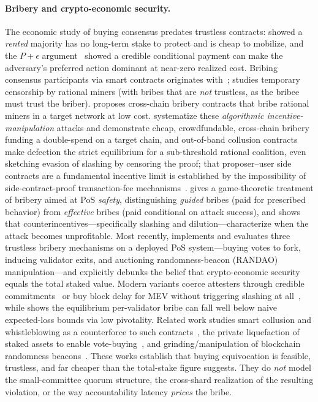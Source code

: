 \paragraph{Bribery and crypto-economic security.}
The economic study of buying consensus predates trustless contracts: \cite{bonneau2016rent} showed a
\emph{rented} majority has no long-term stake to protect and is cheap to mobilize, and the
$P{+}\epsilon$ argument~\cite{buterin2015pepsilon} showed a credible conditional payment can make the
adversary's preferred action dominant at near-zero realized cost. Bribing consensus participants via
smart contracts originates with~\cite{mccorry2018smart};
\cite{winzer2019temporary} studies temporary censorship by rational miners (with bribes that are
\emph{not} trustless, as the bribee must trust the briber). \cite{tran2023crosschain} proposes
cross-chain bribery contracts that bribe rational miners in a target network at low cost.
\cite{judmayer2021sok,judmayer2021paytowin} systematize these \emph{algorithmic
incentive-manipulation} attacks and demonstrate cheap, crowdfundable, cross-chain bribery funding a
double-spend on a target chain, and out-of-band collusion contracts~\cite{zhang2023outofband} make
defection the strict equilibrium for a sub-threshold rational coalition, even sketching evasion of
slashing by censoring the proof; that proposer--user side contracts are a fundamental incentive limit
is established by the impossibility of side-contract-proof transaction-fee
mechanisms~\cite{roughgarden2021tfm,chung2023foundations}.
\cite{karakostas2024bribing} gives a game-theoretic treatment of bribery aimed at PoS \emph{safety},
distinguishing \emph{guided} bribes (paid for prescribed behavior) from \emph{effective} bribes
(paid conditional on attack success), and shows that counterincentives---specifically slashing and
dilution---characterize when the attack becomes unprofitable. Most recently,
\cite{sookitoth2025bribers} implements and evaluates three trustless bribery mechanisms on a deployed
PoS system---buying votes to fork, inducing validator exits, and auctioning randomness-beacon
(RANDAO) manipulation---and explicitly debunks the belief that crypto-economic security equals the
total staked value. Modern variants coerce attesters through credible
commitments~\cite{sarenche2024commitment} or buy block delay for MEV without triggering slashing at
all~\cite{yang2024bride}, while \cite{newman2023decentralization} shows the equilibrium per-validator
bribe can fall well below naive expected-loss bounds via low pivotality. Related work studies smart
collusion and whistleblowing as a counterforce to
such contracts~\cite{kelkar2025omerta}, the private liquefaction of staked assets to enable
vote-buying~\cite{austgen2025liquefaction}, and grinding/manipulation of blockchain randomness
beacons~\cite{gazi2025grinding}. These works establish that buying equivocation is feasible,
trustless, and far cheaper than the total-stake figure suggests. They do \emph{not} model the
small-committee quorum structure, the cross-shard realization of the resulting violation, or the way
accountability latency \emph{prices} the bribe.

